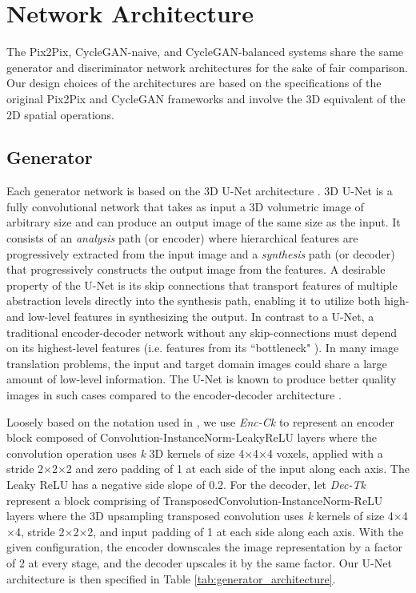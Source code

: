 \section{Network Architecture}
\label{network_architectures}
The Pix2Pix, CycleGAN-naive, and CycleGAN-balanced systems share the same generator and discriminator network architectures for the sake of fair comparison. Our design choices of the architectures are based on the specifications of the original Pix2Pix and CycleGAN frameworks \cite{isola2017image, zhu2017unpaired} and involve the 3D equivalent of the 2D spatial operations.

\subsection{Generator}
Each generator network is based on the 3D U-Net architecture \cite{cciccek20163d}. 3D U-Net is a fully convolutional network that takes as input a 3D volumetric image of arbitrary size and can produce an output image of the same size as the input. It consists of an \textit{analysis} path (or encoder) where hierarchical features are progressively extracted from the input image and a \textit{synthesis} path (or decoder) that progressively constructs the output image from the features. A desirable property of the U-Net is its skip connections that transport features of multiple abstraction levels directly into the synthesis path, enabling it to utilize both high- and low-level features in synthesizing the output. In contrast to a U-Net, a traditional encoder-decoder network without any skip-connections must depend on its highest-level features (i.e. features from its ``bottleneck" ). In many image translation problems, the input and target domain images could share a large amount of low-level information. The U-Net is known to produce better quality images in such cases compared to the encoder-decoder architecture \cite{isola2017image}.

Loosely based on the notation used in \cite{isola2017image}, we use \textit{Enc-Ck} to represent an encoder block composed of Convolution-InstanceNorm-LeakyReLU layers where the convolution operation uses \textit{k} 3D kernels of size 4$\times$4$\times$4 voxels, applied with a stride 2$\times$2$\times$2 and zero padding of 1 at each side of the input along each axis. The Leaky ReLU has a negative side slope of 0.2. For the decoder, let \textit{Dec-Tk} represent a block comprising of TransposedConvolution-InstanceNorm-ReLU layers where the 3D upsampling transposed convolution uses \textit{k} kernels of size 4$\times$4$\times$4, stride 2$\times$2$\times$2, and input padding of 1 at each side along each axis. With the given configuration, the encoder downscales the image representation by a factor of 2 at every stage, and the decoder upscales it by the same factor. Our U-Net architecture is then specified in Table \ref{tab:generator_architecture}.

